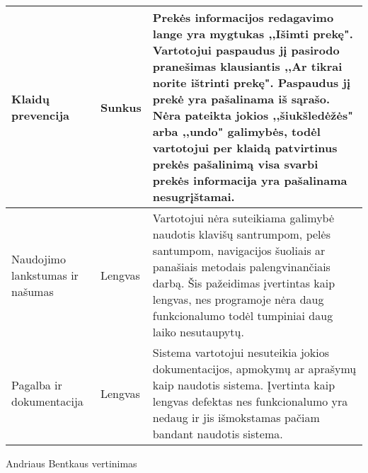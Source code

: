 \documentclass[oneside]{VUMIFPSkursinis}
\begin{document}
\begin{center}
    \begin{tabular}{ |p{3cm}| p{3cm} | p{11cm} | }
	\hline
	Klaidų prevencija & Sunkus & Prekės informacijos redagavimo lange yra mygtukas ,,Išimti prekę". 
					Vartotojui paspaudus jį pasirodo pranešimas klausiantis ,,Ar tikrai norite ištrinti prekę". 
					Paspaudus jį prekė yra pašalinama iš sąrašo.
					Nėra pateikta jokios ,,šiukšledėžės" arba ,,undo" galimybės, todėl vartotojui per klaidą patvirtinus prekės pašalinimą visa svarbi prekės informacija yra pašalinama nesugrįštamai. \\ \hline
	Naudojimo lankstumas ir našumas & Lengvas & Vartotojui nėra suteikiama galimybė naudotis klavišų santrumpom, pelės santumpom, navigacijos šuoliais ar panašiais metodais palengvinančiais darbą.
								Šis pažeidimas įvertintas kaip lengvas, nes programoje nėra daug funkcionalumo todėl tumpiniai daug laiko nesutaupytų. \\ \hline
	Pagalba ir dokumentacija & Lengvas & Sistema vartotojui nesuteikia jokios dokumentacijos, apmokymų ar aprašymų kaip naudotis sistema. 
							Įvertinta kaip lengvas defektas nes funkcionalumo yra nedaug ir jis išmokstamas pačiam bandant naudotis sistema. \\ \hline
   \hline
    \end{tabular}
\end{center}
Andriaus Bentkaus vertinimas
\end{document}
